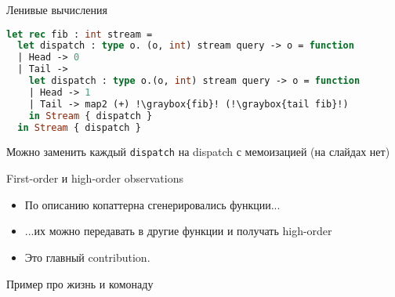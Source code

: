 \documentclass[10pt, mathserif]{beamer}
\newcommand{\graybox}[1]{\colorbox{light-gray}{#1}}
\theoremstyle{definition}
\begin{document}
\begin{frame}[fragile]{Ленивые вычисления}
\begin{lstlisting}[language=ocaml]
let rec fib : int stream =
  let dispatch : type o. (o, int) stream query -> o = function
  | Head -> 0
  | Tail ->
    let dispatch : type o.(o, int) stream query -> o = function
    | Head -> 1
    | Tail -> map2 (+) !\graybox{fib}! (!\graybox{tail fib}!)
    in Stream { dispatch }
  in Stream { dispatch }
\end{lstlisting}

Можно заменить каждый \lstinline=dispatch= на dispatch с мемоизацией (на слайдах нет)
\end{frame}

\begin{frame}[fragile]{First-order и high-order observations}
\begin{itemize}
 \item По описанию копаттерна сгенерировались функции...
 \item ...их можно передавать в другие функции и получать high-order
 \item Это главный contribution.
\end{itemize}
\end{frame}

\begin{frame}[fragile]{Пример про жизнь и комонаду}
$ $
\end{frame}
\end{document}
